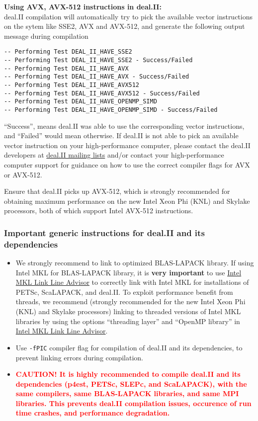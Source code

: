 {\bf Using AVX, AVX-512 instructions in deal.II:}\\
deal.II compilation will automatically try to pick the available vector instructions on the sytem like SSE2, AVX and AVX-512, and generate the following output message during compilation   
\begin{verbatim}
-- Performing Test DEAL_II_HAVE_SSE2
-- Performing Test DEAL_II_HAVE_SSE2 - Success/Failed
-- Performing Test DEAL_II_HAVE_AVX
-- Performing Test DEAL_II_HAVE_AVX - Success/Failed
-- Performing Test DEAL_II_HAVE_AVX512
-- Performing Test DEAL_II_HAVE_AVX512 - Success/Failed
-- Performing Test DEAL_II_HAVE_OPENMP_SIMD
-- Performing Test DEAL_II_HAVE_OPENMP_SIMD - Success/Failed
\end{verbatim}
``Success'', means deal.II was able to use the corresponding vector instructions, and ``Failed'' would mean otherwise. If deal.II is not able to pick an available vector instruction on your high-performance computer, please contact the deal.II developers at \href{https://groups.google.com/d/forum/dealii}{deal.II mailing lists} and/or contact your high-performance computer support for guidance on how to use the correct compiler flags for AVX or AVX-512. 

Ensure that deal.II picks up AVX-512, which is strongly recommended for obtaining maximum performance on the new Intel Xeon Phi (KNL) and Skylake processors, both of which support Intel AVX-512 instructions.

\subsubsection{Important generic instructions for deal.II and its dependencies}
\begin{itemize}
\item We strongly recommend to link to optimized BLAS-LAPACK library. If using Intel MKL for BLAS-LAPACK library, it is {\bf very important} to use \href{https://software.intel.com/en-us/articles/intel-mkl-link-line-advisor}{Intel MKL Link Line Advisor} to correctly link with Intel MKL for installations of PETSc, ScaLAPACK, and deal.II. To exploit performance benefit from threads, we recommend (strongly recommended for the new Intel Xeon Phi (KNL) and Skylake processors) linking to threaded versions of Intel MKL libraries by using the options ``threading layer'' and  ``OpenMP library'' in \href{https://software.intel.com/en-us/articles/intel-mkl-link-line-advisor}{Intel MKL Link Line Advisor}.

\item Use \verb|-fPIC| compiler flag for compilation of deal.II and its dependencies, to prevent linking errors during \dftfe{} compilation.	

\item \textcolor{red}{\bf CAUTION! It is  highly recommended to compile deal.II and its dependencies (p4est, PETSc, SLEPc, and ScaLAPACK),  with the same compilers, same BLAS-LAPACK libraries, and same MPI libraries. This prevents deal.II compilation issues, occurence of run time crashes, and \dftfe{} performance degradation.}  
\end{itemize}

